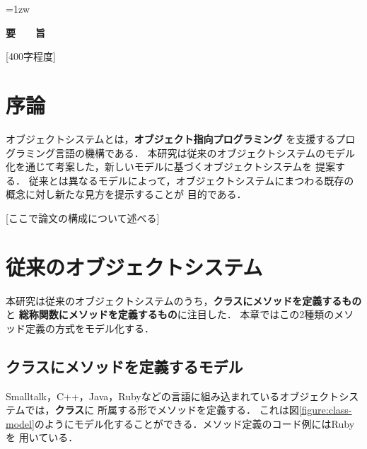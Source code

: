 \documentclass[a4paper,11pt,dvipdfmx]{jreport}
\title{\Underline{Containerless：オブジェクトシステムの新しいとらえ方}}
\author{林 拓人}
\begin{document}
\maketitle
\thispagestyle{empty}
\newpage

\thispagestyle{empty}
\vspace*{20pt plus 1fil}
\parindent=1zw
\noindent
\begin{center}
{\Large \bf 要　　旨}
\vspace{2cm}
\end{center}
[400字程度]

\par
\vspace{0pt plus 1fil}
\newpage

\tableofcontents
\listoffigures

\pagebreak \setcounter{page}{1}


\chapter{序論}

オブジェクトシステムとは，\textbf{オブジェクト指向プログラミング}\cite{Stroustrup:1988:OP:624569.624721}
を支援するプログラミング言語の機構である．
本研究は従来のオブジェクトシステムのモデル化を通じて考案した，新しいモデルに基づくオブジェクトシステムを
提案する．
従来とは異なるモデルによって，オブジェクトシステムにまつわる既存の概念に対し新たな見方を提示することが
目的である．

[ここで論文の構成について述べる]


\chapter{従来のオブジェクトシステム}
\label{chapter:conventional}

本研究は従来のオブジェクトシステムのうち，\textbf{クラスにメソッドを定義するもの}と
\textbf{総称関数にメソッドを定義するもの}に注目した．
本章ではこの2種類のメソッド定義の方式をモデル化する．

\section{クラスにメソッドを定義するモデル}

Smalltalk，C++，Java，Rubyなどの言語に組み込まれているオブジェクトシステムでは，\textbf{クラス}に
所属する形でメソッドを定義する．
これは図\ref{figure:class-model}のようにモデル化することができる．メソッド定義のコード例にはRubyを
用いている．
\end{document}

